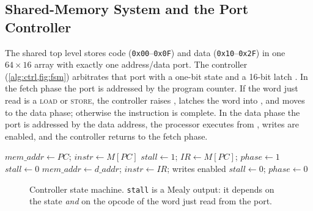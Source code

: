 \documentclass[conference]{IEEEtran}
\newcommand{\sig}[1]{\texttt{\detokenize{#1}}}
\begin{document}
\subsection{Shared-Memory System and the Port Controller}
\label{sec:controller}
The shared top level stores code (\texttt{0x00}--\texttt{0x0F}) and data
(\texttt{0x10}--\texttt{0x2F}) in one $64\times16$ array with exactly one address/data port. The
controller (\cref{alg:ctrl,fig:fsm}) arbitrates that port with a one-bit state \sig{phase} and a
16-bit latch \sig{IR}. In the fetch phase the port is addressed by the program counter. If the word
just read is a \textsc{load} or \textsc{store}, the controller raises \sig{stall}, latches the word
into \sig{IR}, and moves to the data phase; otherwise the instruction is complete. In the data
phase the port is addressed by the data address, the processor executes from \sig{IR}, writes are
enabled, and the controller returns to the fetch phase.

\begin{algorithm}[t]
\caption{Port controller, one clock cycle (\texttt{rtl/shared\_mem\_controller.v})}
\label{alg:ctrl}
\footnotesize
\begin{algorithmic}[1]
 
  \State $\mathit{mem\_addr} \gets \mathit{PC}$;\; $\mathit{instr} \gets M[\mathit{PC}]$
    \State $\mathit{stall}\gets1$;\; $\mathit{IR}\gets M[\mathit{PC}]$;\; $\mathit{phase}\gets1$
  \Else
    \State $\mathit{stall}\gets0$ 
  \EndIf
\Else {}
  \State $\mathit{mem\_addr}\gets\mathit{d\_addr}$;\; $\mathit{instr}\gets\mathit{IR}$; writes enabled
  \State $\mathit{stall}\gets0$;\; $\mathit{phase}\gets0$ 
\EndIf
\end{algorithmic}
\end{algorithm}

\begin{figure}[t]
\centering
{}
\caption{Controller state machine. \texttt{stall} is a Mealy output: it depends on the state
\emph{and} on the opcode of the word just read from the port.}
\label{fig:fsm}
\end{figure}
\end{document}
